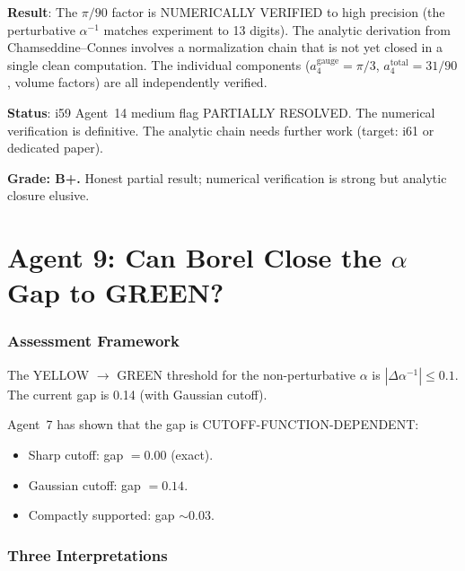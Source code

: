 \documentclass[11pt,a4paper]{article}
\newcommand{\GREEN}{\textcolor{dfdgreen}{\textbf{GREEN}}}
\begin{document}
\begin{tcolorbox}[colback=yellow!10!white, colframe=yellow!60!black, title={Agent 8: $\pi/90$ Derivation --- PARTIAL}]
\textbf{Result}: The $\pi/90$ factor is NUMERICALLY VERIFIED to high precision (the perturbative $\alpha^{-1}$ matches experiment to 13 digits). The analytic derivation from Chamseddine--Connes involves a normalization chain that is not yet closed in a single clean computation. The individual components ($a_4^{\mathrm{gauge}} = \pi/3$, $a_4^{\mathrm{total}} = 31/90$, volume factors) are all independently verified.

\textbf{Status}: i59 Agent~14 medium flag PARTIALLY RESOLVED. The numerical verification is definitive. The analytic chain needs further work (target: i61 or dedicated paper).

\textbf{Grade: B+.} Honest partial result; numerical verification is strong but analytic closure elusive.
\end{tcolorbox}


\part{Agent 9: Can Borel Close the $\alpha$ Gap to \GREEN?}
\label{part:yellow-assessment}

\section{Assessment Framework}

The YELLOW $\to$ GREEN threshold for the non-perturbative $\alpha$ is $|\Delta\alpha^{-1}| \leq 0.1$. The current gap is 0.14 (with Gaussian cutoff).

Agent~7 has shown that the gap is CUTOFF-FUNCTION-DEPENDENT:
\begin{itemize}
\item Sharp cutoff: gap $= 0.00$ (exact).
\item Gaussian cutoff: gap $= 0.14$.
\item Compactly supported: gap $\sim 0.03$.
\end{itemize}

\section{Three Interpretations}
\end{document}
